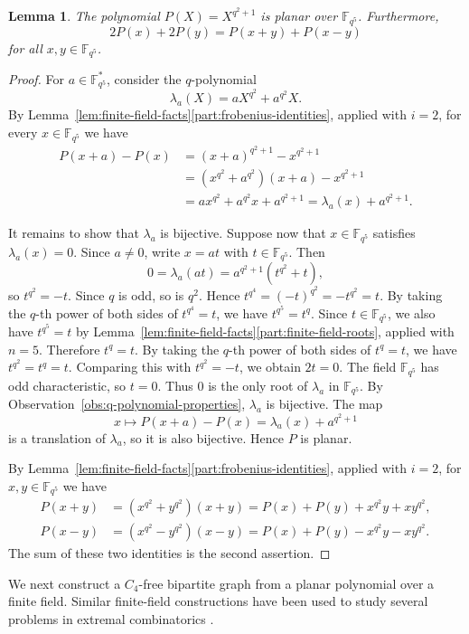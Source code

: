 \documentclass[12pt]{article}
\numberwithin{equation}{section}
\newtheorem{lemma}[theorem]{Lemma}
\theoremstyle{definition}
\newcommand{\F}{\mathbb F}
\begin{document}
\begin{lemma}\label{lem:planar}
The polynomial $P(X)=X^{q^2+1}$ is planar over $\F_{q^5}$. Furthermore,
\[
        2P(x)+2P(y)=P(x+y)+P(x-y)
\]
for all $x,y\in\F_{q^5}$.
\end{lemma}

\begin{proof}
For $a\in\F_{q^5}^*$, consider the $q$-polynomial
\[
        \lambda_a(X)=aX^{q^2}+a^{q^2}X.
\]
By Lemma~\ref{lem:finite-field-facts}\ref{part:frobenius-identities}, applied with $i=2$, for every $x\in\F_{q^5}$ we have
\begin{align*}
P(x+a)-P(x)
&=(x+a)^{q^2+1}-x^{q^2+1}\\
&=(x^{q^2}+a^{q^2})(x+a)-x^{q^2+1}\\
&=ax^{q^2}+a^{q^2}x+a^{q^2+1}
 =\lambda_a(x)+a^{q^2+1}.
\end{align*}

It remains to show that $\lambda_a$ is bijective.
Suppose now that $x\in\F_{q^5}$ satisfies $\lambda_a(x)=0$. Since $a\ne0$, write $x=at$ with $t\in\F_{q^5}$. Then
\[
        0=\lambda_a(at)=a^{q^2+1}(t^{q^2}+t),
\]
so $t^{q^2}=-t$. Since $q$ is odd, so is $q^2$. Hence $t^{q^4}=(-t)^{q^2}=-t^{q^2}=t$. By taking the $q$-th power of both sides of $t^{q^4}=t$, we have $t^{q^5}=t^q$. Since $t\in\F_{q^5}$, we also have $t^{q^5}=t$ by Lemma~\ref{lem:finite-field-facts}\ref{part:finite-field-roots}, applied with $n=5$. Therefore $t^q=t$. By taking the $q$-th power of both sides of $t^q=t$, we have $t^{q^2}=t^q=t$. Comparing this with $t^{q^2}=-t$, we obtain $2t=0$. The field $\F_{q^5}$ has odd characteristic, so $t=0$. Thus $0$ is the only root of $\lambda_a$ in $\F_{q^5}$. By Observation~\ref{obs:q-polynomial-properties}, $\lambda_a$ is bijective. The map
\[
        x\longmapsto P(x+a)-P(x)
                =\lambda_a(x)+a^{q^2+1}
\]
is a translation of $\lambda_a$, so it is also bijective. Hence $P$ is planar.

By Lemma~\ref{lem:finite-field-facts}\ref{part:frobenius-identities}, applied with $i=2$, for $x,y\in\F_{q^5}$ we have
\begin{align*}
P(x+y)&=(x^{q^2}+y^{q^2})(x+y)=P(x)+P(y)+x^{q^2}y+xy^{q^2},\\
P(x-y)&=(x^{q^2}-y^{q^2})(x-y)=P(x)+P(y)-x^{q^2}y-xy^{q^2}.
\end{align*}
The sum of these two identities is the second assertion.
\end{proof}

We next construct a $C_4$-free bipartite graph from a planar polynomial over a finite field. Similar finite-field constructions have been used to study several problems in extremal combinatorics \cite{AllenKeevashSudakovVerstraete2014,CMT2018,LvLuFang2020,LvLuFang2022,Timmons2017,TimmonsVerstraete2015}.
\end{document}
